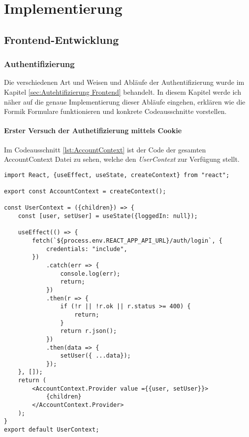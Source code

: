 
\chapter{Implementierung}
    \section{Frontend-Entwicklung}
    \subsection{Authentifizierung}
    \label{sec:Auth-Impl-Front}
Die verschiedenen Art und Weisen und Abläufe der Authentifizierung wurde im Kapitel \ref{sec:Autehtifizierung Frontend} behandelt.
In diesem Kapitel werde ich näher auf die genaue Implementierung dieser Abläufe eingehen, erklären wie die Formik Formulare funktionieren und konkrete Codeausschnitte vorstellen.
    \subsubsection{Erster Versuch der Authetifizierung mittels Cookie}
    \label{sec:Cookie-auth}
Im Codeausschnitt \ref{lst:AccountContext} ist der Code der gesamten AccountContext Datei zu sehen, welche den \textit{UserContext} zur Verfügung stellt.

\begin{lstlisting}[style=codeStyle, caption={Die AccountContext.js-Datei}, label={lst:AccountContext}]
import React, {useEffect, useState, createContext} from "react";

export const AccountContext = createContext();

const UserContext = ({children}) => {
    const [user, setUser] = useState({loggedIn: null});

    useEffect(() => {
        fetch(`${process.env.REACT_APP_API_URL}/auth/login`, {
            credentials: "include",
        })
            .catch(err => {
                console.log(err);
                return;
            })
            .then(r => {
                if (!r || !r.ok || r.status >= 400) {
                    return;
                }
                return r.json();
            })
            .then(data => {
                setUser({ ...data});
            });
    }, []);
    return (
        <AccountContext.Provider value ={{user, setUser}}>
            {children}
        </AccountContext.Provider>
    );
}
export default UserContext;
\end{lstlisting}


